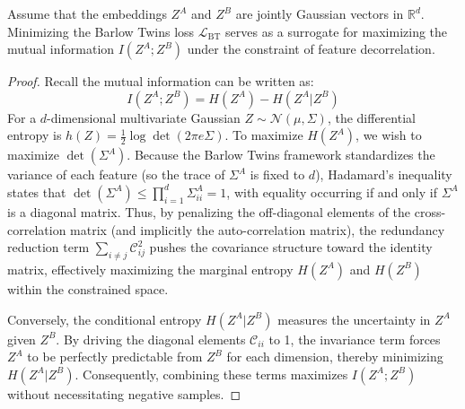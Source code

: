 \begin{theorem}
Assume that the embeddings $Z^A$ and $Z^B$ are jointly Gaussian vectors in $\mathbb{R}^d$. Minimizing the Barlow Twins loss $\mathcal{L}_{\text{BT}}$ serves as a surrogate for maximizing the mutual information $I(Z^A; Z^B)$ under the constraint of feature decorrelation.
\end{theorem}
\begin{proof}
Recall the mutual information can be written as:
\begin{equation}
    I(Z^A; Z^B) = H(Z^A) - H(Z^A | Z^B)
\end{equation}
For a $d$-dimensional multivariate Gaussian $Z \sim \mathcal{N}(\mu, \Sigma)$, the differential entropy is $h(Z) = \frac{1}{2} \log \det(2\pi e \Sigma)$.
To maximize $H(Z^A)$, we wish to maximize $\det(\Sigma^A)$. Because the Barlow Twins framework standardizes the variance of each feature (so the trace of $\Sigma^A$ is fixed to $d$), Hadamard's inequality states that $\det(\Sigma^A) \leq \prod_{i=1}^d \Sigma^A_{ii} = 1$, with equality occurring if and only if $\Sigma^A$ is a diagonal matrix.
Thus, by penalizing the off-diagonal elements of the cross-correlation matrix (and implicitly the auto-correlation matrix), the redundancy reduction term $\sum_{i \neq j} \mathcal{C}_{ij}^2$ pushes the covariance structure toward the identity matrix, effectively maximizing the marginal entropy $H(Z^A)$ and $H(Z^B)$ within the constrained space.

Conversely, the conditional entropy $H(Z^A | Z^B)$ measures the uncertainty in $Z^A$ given $Z^B$. By driving the diagonal elements $\mathcal{C}_{ii}$ to 1, the invariance term forces $Z^A$ to be perfectly predictable from $Z^B$ for each dimension, thereby minimizing $H(Z^A | Z^B)$.
Consequently, combining these terms maximizes $I(Z^A; Z^B)$ without necessitating negative samples.
\end{proof}

